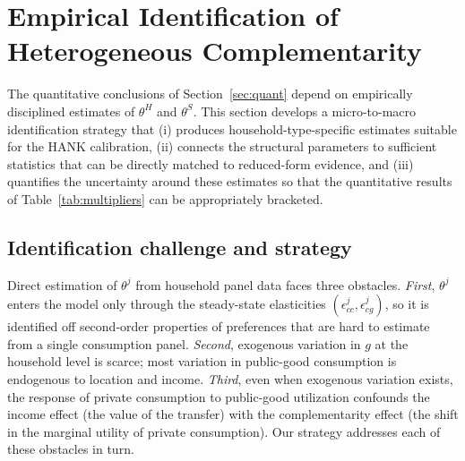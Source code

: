 \section{Empirical Identification of Heterogeneous Complementarity}
\label{sec:empirical}

The quantitative conclusions of Section~\ref{sec:quant} depend on
empirically disciplined estimates of $\theta^{H}$ and $\theta^{S}$. This section
develops a micro-to-macro identification strategy that (i) produces
household-type-specific estimates suitable for the HANK calibration,
(ii) connects the structural parameters to sufficient statistics that can be
directly matched to reduced-form evidence, and (iii) quantifies the
uncertainty around these estimates so that the quantitative results of
Table~\ref{tab:multipliers} can be appropriately bracketed.

\subsection{Identification challenge and strategy}
\label{subsec:identif-challenge}

Direct estimation of $\theta^{j}$ from household panel data faces three
obstacles. \emph{First}, $\theta^{j}$ enters the model only through the
steady-state elasticities $(\epsilon^{j}_{cc},\epsilon^{j}_{cg})$, so it is
identified off second-order properties of preferences that are hard to
estimate from a single consumption panel. \emph{Second}, exogenous variation in
$g$ at the household level is scarce; most variation in public-good consumption
is endogenous to location and income. \emph{Third}, even when exogenous
variation exists, the response of private consumption to public-good
utilization confounds the income effect (the value of the transfer) with the
complementarity effect (the shift in the marginal utility of private
consumption). Our strategy addresses each of these obstacles in turn.

